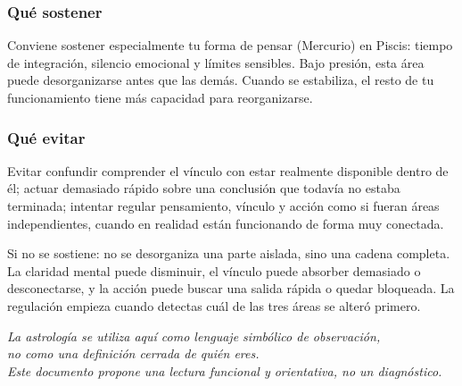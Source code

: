 \documentclass[11pt,a4paper]{article}
\begin{document}
\subsubsection*{Qué sostener}

\RaggedRight
Conviene sostener especialmente tu forma de pensar (Mercurio) en Piscis: tiempo de integración, silencio emocional y límites sensibles. Bajo presión, esta área puede desorganizarse antes que las demás. Cuando se estabiliza, el resto de tu funcionamiento tiene más capacidad para reorganizarse.

\subsubsection*{Qué evitar}

\RaggedRight
Evitar confundir comprender el vínculo con estar realmente disponible dentro de él; actuar demasiado rápido sobre una conclusión que todavía no estaba terminada; intentar regular pensamiento, vínculo y acción como si fueran áreas independientes, cuando en realidad están funcionando de forma muy conectada.

\vspace{0.6cm}

\RaggedRight
Si no se sostiene: no se desorganiza una parte aislada, sino una cadena completa. La claridad mental puede disminuir, el vínculo puede absorber demasiado o desconectarse, y la acción puede buscar una salida rápida o quedar bloqueada. La regulación empieza cuando detectas cuál de las tres áreas se alteró primero.

\vspace{1.2cm}

\begin{center}
{\small\itshape\color{grisai}
La astrología se utiliza aquí como lenguaje simbólico de observación,\\
no como una definición cerrada de quién eres.\\[0.2cm]
Este documento propone una lectura funcional y orientativa, no un diagnóstico.
}
\end{center}
\end{document}
